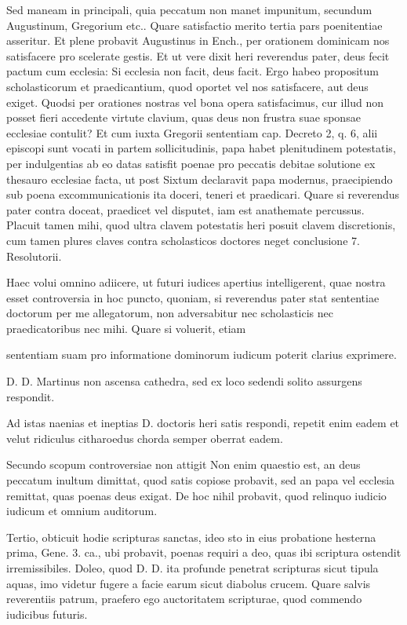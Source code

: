 Sed maneam in principali, quia peccatum non manet impunitum, secundum Augustinum, Gregorium etc.. Quare satisfactio merito tertia pars poenitentiae asseritur. Et plene probavit Augustinus in Ench., per orationem dominicam nos satisfacere pro scelerate gestis. Et ut vere dixit heri reverendus pater, deus fecit pactum cum ecclesia: Si ecclesia non facit, deus facit. Ergo habeo propositum scholasticorum et praedicantium, quod oportet vel nos satisfacere, aut deus exiget. Quodsi per orationes nostras vel bona opera satisfacimus, cur illud non posset fieri accedente virtute clavium, quas deus non frustra suae sponsae ecclesiae contulit? Et cum iuxta Gregorii sententiam cap. Decreto 2, q. 6, alii episcopi sunt vocati in partem sollicitudinis, papa habet plenitudinem potestatis, per indulgentias ab eo datas satisfit poenae pro peccatis debitae solutione ex thesauro ecclesiae facta, ut post Sixtum declaravit papa modernus, praecipiendo sub poena excommunicationis ita doceri, \marginpar{\small[382]} teneri et praedicari. Quare si reverendus pater contra doceat, praedicet vel disputet, iam est anathemate percussus. Placuit tamen mihi, quod ultra clavem potestatis heri posuit clavem discretionis, cum tamen plures claves contra scholasticos doctores neget conclusione 7. Resolutorii.

Haec volui omnino adiicere, ut futuri iudices apertius intelligerent, quae nostra esset controversia in hoc puncto, quoniam, si reverendus pater stat sententiae doctorum per me allegatorum, non adversabitur nec scholasticis nec praedicatoribus nec mihi. Quare si voluerit, etiam

sententiam suam pro informatione dominorum iudicum poterit clarius exprimere.

D. D. Martinus
non ascensa cathedra, sed ex loco sedendi solito
assurgens respondit.

Ad istas naenias et ineptias D. doctoris heri satis respondi, repetit enim eadem et velut ridiculus citharoedus chorda semper oberrat eadem.

Secundo scopum controversiae non attigit Non enim quaestio est, an deus peccatum inultum dimittat, quod satis copiose probavit, sed an papa vel ecclesia remittat, quas poenas deus exigat. De hoc nihil probavit, quod relinquo iudicio iudicum et omnium auditorum.

Tertio, obticuit hodie scripturas sanctas, ideo sto in eius probatione hesterna prima, Gene. 3. ca., ubi probavit, poenas requiri a deo, quas ibi scriptura ostendit irremissibiles. Doleo, quod D. D. ita profunde penetrat scripturas sicut tipula aquas, imo videtur fugere a facie earum sicut diabolus crucem. Quare salvis reverentiis patrum, praefero ego auctoritatem scripturae, quod commendo iudicibus futuris.

